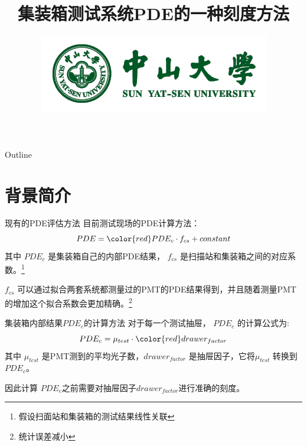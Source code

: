 \documentclass[11pt,compress,xcolor=x11names,UTF8]{beamer}
\title{集装箱测试系统PDE的一种刻度方法}
\author[赵荣]{Email：zhaor25@mail2.sysu.edu.cn \and  } %
\institute[中山大学]{School of Physics\and } %
\date[\today]{\includegraphics[width=.5\textwidth]{logo}}
\begin{document}
\maketitle

\begin{frame}{Outline}
\tableofcontents
\end{frame}

\section{背景简介}


\begin{frame}{现有的PDE评估方法}
目前测试现场的PDE计算方法：
\begin{equation}
PDE={\color{red}PDE_c}\cdot f_{cs}+constant
\end{equation}
其中 $PDE_c$ 是集装箱自己的内部PDE结果，  $f_{cs}$ 是扫描站和集装箱之间的对应系数。\footnote{假设扫面站和集装箱的测试结果线性关联}
\vspace{.5cm}

$f_{cs}$ 可以通过拟合两套系统都测量过的PMT的PDE结果得到，并且随着测量PMT的增加这个拟合系数会更加精确。\footnote{统计误差减小} 
\end{frame}
\begin{frame}{集装箱内部结果$PDE_{c}$的计算方法}
对于每一个测试抽屉， $PDE_c$ 的计算公式为:
\begin{equation}
PDE_c=\mu_{test}\cdot {\color{red}drawer_{factor}}
\label{pde_formula}
\end{equation}
其中 $\mu_{test}$ 是PMT测到的平均光子数，$drawer_{factor}$ 是抽屉因子，它将$\mu_{test}$ 转换到 $PDE_c$。

\vspace{.5cm}
\alert{因此计算 $PDE_c$之前需要对抽屉因子$drawer_{factor}$进行准确的刻度。}
\end{frame}
\end{document}
